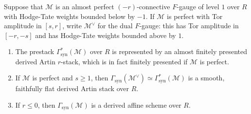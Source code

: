 \documentclass[10pt]{amsart}
\begin{document}
\begin{corollary}
\label{cor:1_bounded_level_1_repble}
Suppose that $\mathcal{M}$ is an almost perfect $(-r)$-connective $F$-gauge of level $1$ over $R$ with Hodge-Tate weights bounded below by $-1$. If $\mathcal{M}$ is perfect with Tor amplitude in $[s,r]$, write $\mathcal{M}^\vee$ for the dual $F$-gauge: this has Tor amplitude in $[-r,-s]$ and has Hodge-Tate weights bounded above by $1$.
\begin{enumerate}
   \item The prestack $\Gamma^*_{\mathrm{syn}}(\mathcal{M})$ over $R$ is represented by an almost finitely presented derived Artin $r$-stack, which is in fact finitely presented if $\mathcal{M}$ is perfect.
   \item If $\mathcal{M}$ is perfect and $s\ge 1$, then $\Gamma_{\mathrm{syn}}(\mathcal{M}^\vee)\simeq \Gamma_{\mathrm{syn}}^*(\mathcal{M})$ is a smooth, faithfully flat derived Artin stack over $R$.
   \item If $r\leq 0$, then $\Gamma_{\mathrm{syn}}(\mathcal{M})$ is a derived affine scheme over $R$.
\end{enumerate}
\end{corollary}
\end{document}
